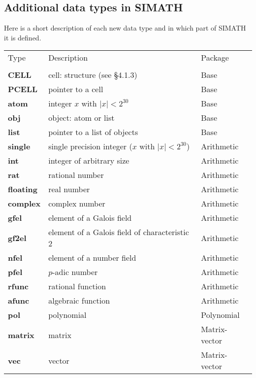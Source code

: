 \subsection{Additional data types in SIMATH}
Here is a short description of each new data type and in which part of SIMATH
it is defined.
\leer
\begin{tabular}{lll}
Type & Description & Package\\
\cline{1-3} \\
{\bf CELL}\index{CELL}\footnotemark[1] & cell: structure (see \S 4.1.3) & Base\\
{\bf PCELL}\index{PCELL}\footnotemark[1] & pointer to a cell & Base\\
{\bf atom}\index{atom} & integer $x$ with $|x|<2^{30}$ & Base\\    
{\bf obj}\index{obj} & object: atom or list & Base\\    
{\bf list}\index{list} & pointer to a list of objects & Base\\    
{\bf single}\index{list} & single precision integer ($x$ with $|x|<2^{30}$) & Arithmetic\\ 
{\bf int}\index{int} & integer of arbitrary size & Arithmetic\\    
{\bf rat}\index{rat} & rational number & Arithmetic\\    
{\bf floating}\index{floating} & real number & Arithmetic\\
{\bf complex}\index{complex} & complex number & Arithmetic\\
{\bf gfel}\index{gfel} & element of a Galois field & Arithmetic\\    
{\bf gf2el}\index{gf2el} & element of a Galois field of characteristic 2 & Arithmetic\\    
{\bf nfel}\index{nfel} & element of a number field & Arithmetic\\
{\bf pfel}\index{pfel} & $p$-adic number & Arithmetic\\    
{\bf rfunc}\index{rfunc} & rational function & Arithmetic\\    
{\bf afunc}\index{afunc} & algebraic function & Arithmetic\\
{\bf pol}\index{pol} & polynomial & Polynomial\\    
{\bf matrix}\index{matrix} & matrix & Matrix-vector\\    
{\bf vec}\index{vec} & vector & Matrix-vector\\   
\end{tabular}

